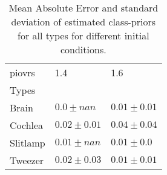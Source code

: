 \begin{table}
\centering
\label{tab:mae}
\caption{Mean Absolute Error and standard deviation of estimated class-priors for all types for different initial conditions.}
\begin{tabular}{p{1.8cm}p{1.8cm}p{1.8cm}}
\toprule
piovrs &                   1.4 &                   1.6 \\
Types    &                       &                       \\
\midrule
Brain    &    $\bm{0.0} \pm nan$ &       $0.01 \pm 0.01$ \\
Cochlea  &  $\bm{0.02} \pm 0.01$ &       $0.04 \pm 0.04$ \\
Slitlamp &   $\bm{0.01} \pm nan$ &        $0.01 \pm 0.0$ \\
Tweezer  &       $0.02 \pm 0.03$ &  $\bm{0.01} \pm 0.01$ \\
\bottomrule
\end{tabular}
\end{table}
